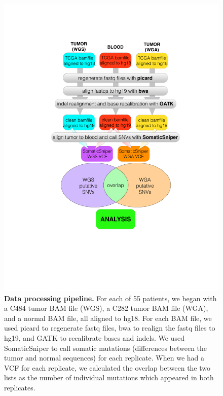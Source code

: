 \documentclass[11 pt]{article} %
\begin{document}
\begin{figure}
\centerline{
\includegraphics[width=5in]{Figure1.pdf} }
\caption{\textbf{Data processing pipeline.} For each of 55 patients, we began with a C484 tumor BAM file (WGS), a C282 tumor BAM file (WGA), and a normal BAM file, all aligned to hg18. For each BAM file, we used picard to regenerate fastq files, bwa to realign the fastq files to hg19, and GATK to recalibrate bases and indels. We used SomaticSniper to call somatic mutations (differences between the tumor and normal sequences) for each replicate. When we had a VCF for each replicate, we calculated the overlap between the two lists as the number of individual mutations which appeared in both replicates.}
\label{fig:pipeline}
\end{figure}
\end{document}
